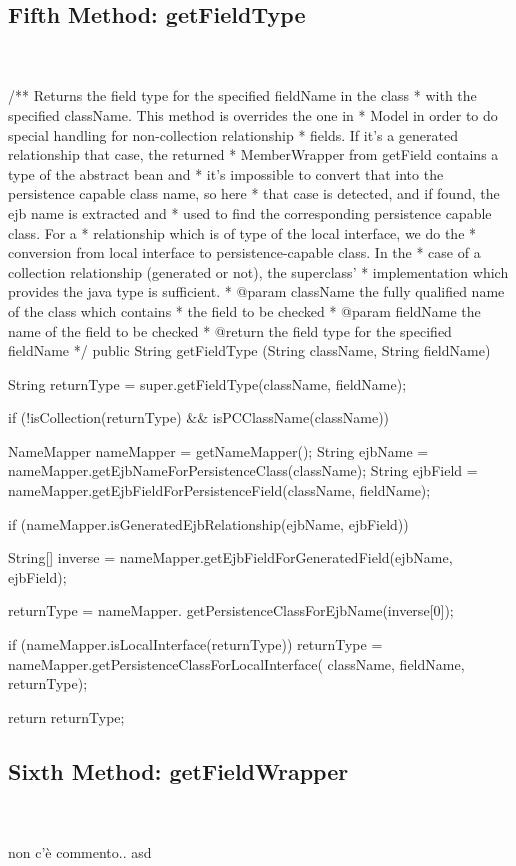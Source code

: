 \newpage
\subsection{Fifth Method: getFieldType} \\ \\
	/** Returns the field type for the specified fieldName in the class
	 * with the specified className.  This method is overrides the one in 
	 * Model in order to do special handling for non-collection relationship 
	 * fields.  If it's a generated relationship that case, the returned 
	 * MemberWrapper from getField contains a type of the abstract bean and 
	 * it's impossible to convert that into the persistence capable class name, so here 
	 * that case is detected, and if found, the ejb name is extracted and 
	 * used to find the corresponding persistence capable class.  For a 
	 * relationship which is of type of the local interface, we do the 
	 * conversion from local interface to persistence-capable class.  In the 
	 * case of a collection relationship (generated or not), the superclass' 
	 * implementation which provides the java type is sufficient.
	 * @param className the fully qualified name of the class which contains
	 * the field to be checked
	 * @param fieldName the name of the field to be checked
	 * @return the field type for the specified fieldName
	 */
	public String getFieldType (String className, String fieldName)
	{
		String returnType = super.getFieldType(className, fieldName);

		if (!isCollection(returnType) && isPCClassName(className))
		{
			NameMapper nameMapper = getNameMapper();
			String ejbName = 
				nameMapper.getEjbNameForPersistenceClass(className);
			String ejbField = 
				nameMapper.getEjbFieldForPersistenceField(className, fieldName);

			if (nameMapper.isGeneratedEjbRelationship(ejbName, ejbField))
			{
				String[] inverse = 
					nameMapper.getEjbFieldForGeneratedField(ejbName, ejbField);
            
				returnType = nameMapper.
					getPersistenceClassForEjbName(inverse[0]);
			}

			if (nameMapper.isLocalInterface(returnType))
			{
				returnType = nameMapper.getPersistenceClassForLocalInterface(
					className, fieldName, returnType);
			}
		}

		return returnType;
	}



\newpage
\subsection{Sixth Method: getFieldWrapper} \\ \\non c'è commento.. asd

